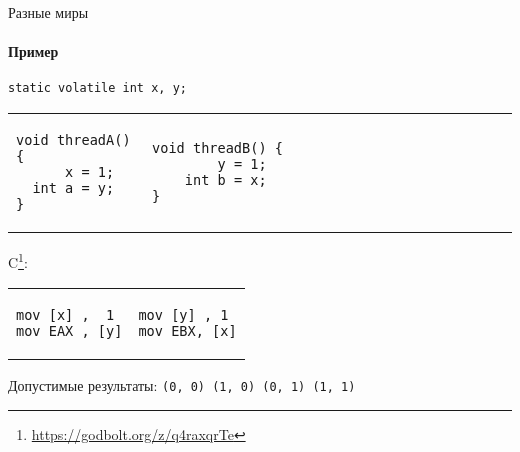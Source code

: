 \begin{frame}[fragile, t]{Разные миры}
\framesubtitle{Пример}

\begin{verbatim}
static volatile int x, y;
\end{verbatim}

\begin{tabular}{p{} p{}}

\begin{verbatim}
void threadA() {
      x = 1;
  int a = y;
}
\end{verbatim}

& 

\begin{verbatim}
void threadB() {                                   
        y = 1;                           
    int b = x;                           
}                    
\end{verbatim}
\end{tabular}

\pause
\vspace{-0.5cm}
C\footnote<2->{\tiny\url{https://godbolt.org/z/q4raxqrTe}}:

\begin{tabular}{p{} p{}}
\begin{verbatim}
mov [x] ,  1
mov EAX , [y]
\end{verbatim}

& 

\begin{verbatim}
mov [y] , 1
mov EBX, [x]
\end{verbatim}
\end{tabular}

\pause
Допустимые результаты: \texttt{(0, 0) (1, 0) (0, 1) (1, 1)}
\end{frame}

